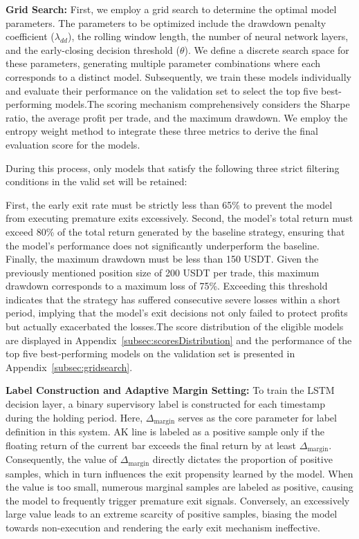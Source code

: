 \documentclass[12pt]{article}
\begin{document}
\textbf{Grid Search:} First, we employ a grid search to determine the optimal model parameters. The parameters to be optimized include the drawdown penalty coefficient ($\lambda_{dd}$), the rolling window length, the number of neural network layers, and the early-closing decision threshold ($\theta$). We define a discrete search space for these parameters, generating multiple parameter combinations where each corresponds to a distinct model. Subsequently, we train these models individually and evaluate their performance on the validation set to select the top five best-performing models.The scoring mechanism comprehensively considers the Sharpe ratio, the average profit per trade, and the maximum drawdown. We employ the entropy weight method to integrate these three metrics to derive the final evaluation score for the models.

During this process, only models that satisfy the following three strict filtering conditions in the valid set will be retained:

First, the early exit rate must be strictly less than 65\% to prevent the model from executing premature exits excessively. Second, the model's total return must exceed 80\% of the total return generated by the baseline strategy, ensuring that the model's performance does not significantly underperform the baseline. Finally, the maximum drawdown must be less than 150 USDT. Given the previously mentioned position size of 200 USDT per trade, this maximum drawdown corresponds to a maximum loss of 75\%. Exceeding this threshold indicates that the strategy has suffered consecutive severe losses within a short period, implying that the model's exit decisions not only failed to protect profits but actually exacerbated the losses.The score distribution of the eligible models are displayed in Appendix~\ref{subsec:scoresDistribution} and the performance of the top five best-performing models on the validation set is presented in Appendix~\ref{subsec:gridsearch}.

\textbf{Label Construction and Adaptive Margin Setting:} To train the LSTM decision layer, a binary supervisory label is constructed for each timestamp during the holding period. Here, $\Delta_{\text{margin}}$ serves as the core parameter for label definition in this system. AK line is labeled as a positive sample only if the floating return of the current bar exceeds the final return by at least $\Delta_{\text{margin}}$. Consequently, the value of $\Delta_{\text{margin}}$ directly dictates the proportion of positive samples, which in turn influences the exit propensity learned by the model. When the value is too small, numerous marginal samples are labeled as positive, causing the model to frequently trigger premature exit signals. Conversely, an excessively large value leads to an extreme scarcity of positive samples, biasing the model towards non-execution and rendering the early exit mechanism ineffective.
\end{document}
